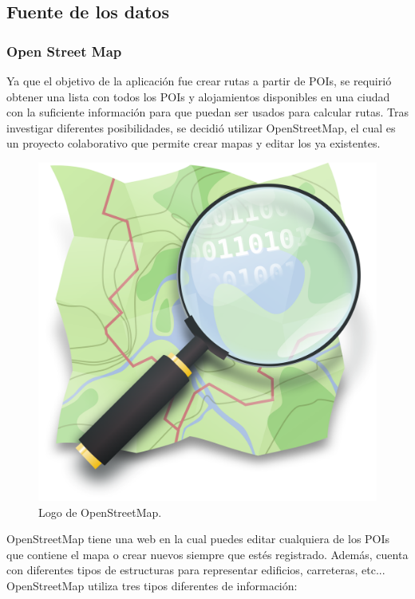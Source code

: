 \subsection[Fuente de los datos]{Fuente de los datos}
\subsubsection[OSM]{Open Street Map}
Ya que el objetivo de la aplicación fue crear rutas a partir de POIs, se requirió obtener una lista con todos los POIs y alojamientos disponibles en una ciudad con la suficiente información para que puedan ser usados para calcular rutas.\newline
Tras investigar diferentes posibilidades, se decidió utilizar OpenStreetMap, el cual es un proyecto colaborativo que permite crear mapas y editar los ya existentes.\newline
\begin{figure}[H]
	\centering
	\includegraphics[scale=0.05]{imagenes/Openstreetmap_logo}
	\caption{Logo de OpenStreetMap.}
	\label{fig:openstreetmap}
\end{figure}
OpenStreetMap tiene una web \cite{openstreetmap} en la cual puedes editar cualquiera de los POIs que contiene el mapa o crear nuevos siempre que estés registrado. Además, cuenta con diferentes tipos de estructuras para representar edificios, carreteras, etc... OpenStreetMap utiliza tres tipos diferentes de información:\newline
